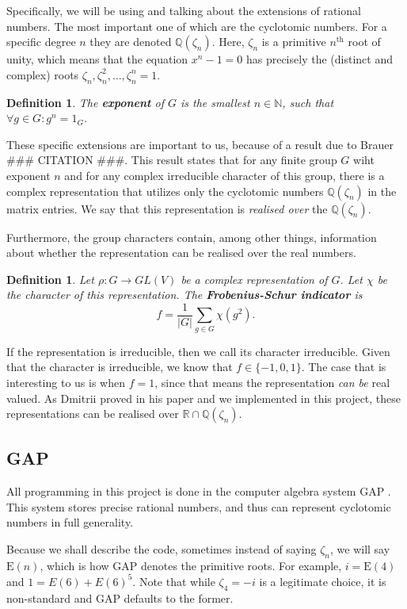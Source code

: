 \documentclass[11pt]{article}
\newtheorem{definition}[theorem]{Definition}
\begin{document}
Specifically, we will be using and talking about the extensions of rational numbers.
The most important one of which are the cyclotomic numbers. For a specific degree $n$ they are denoted $\mathbb{Q}(\zeta_n)$.
Here, $\zeta_n$ is a primitive $n^{\text{th}}$ root of unity, which means that the equation $x^n - 1 = 0$ has
precisely the (distinct and complex) roots $\zeta_n, \zeta_n^2, \ldots, \zeta_n^n = 1$.
\begin{definition}
  The \textbf{exponent} of $G$ is the smallest $n \in \mathbb{N}$, such that $\forall g \in G: g^n = 1_G$.
\end{definition}

These specific extensions are important to us, because of a result due to Brauer \#\#\# CITATION \#\#\#.
This result states that for any finite group $G$ wiht exponent $n$ and for any complex irreducible
character of this group, there is a complex representation that utilizes only the cyclotomic
numbers $\mathbb{Q}(\zeta_n)$ in the matrix entries.
We say that this representation is \textit{realised over} the $\mathbb{Q}(\zeta_n)$.

Furthermore, the group characters contain, among other things, information about whether the representation can
be realised over the real numbers.
\begin{definition}
  Let $\rho: G \rightarrow GL(V)$ be a complex representation of $G$. Let $\chi$ be the character
  of this representation. The \textbf{Frobenius-Schur indicator} is
  \[f = \frac{1}{\lvert G \rvert} \sum_{g \in G}\chi(g^2).\]
\end{definition}
If the representation is irreducible, then we call its character irreducible. Given that
the character is irreducible, we know that $f \in \{-1, 0, 1\}$. The case that is interesting to
us is when $f = 1$, since that means the representation \textit{can be} real valued. As Dmitrii proved
in his paper and we implemented in this project, these representations can be realised over $\mathbb{R} \cap \mathbb{Q}(\zeta_n)$.

\subsection{GAP}

All programming in this project is done in the computer algebra system GAP \cite{GAP4}.
This system stores precise rational numbers, and thus can represent cyclotomic numbers in full generality.

Because we shall describe the code, sometimes instead of saying $\zeta_n$, we will say $\text{E}(n)$,
which is how GAP denotes the primitive roots. For example, $i = \text{E}(4)$ and $1 = E(6) + E(6)^5$.
Note that while $\zeta_4 = -i$ is a legitimate choice, it is non-standard and GAP defaults to the former.
\end{document}
